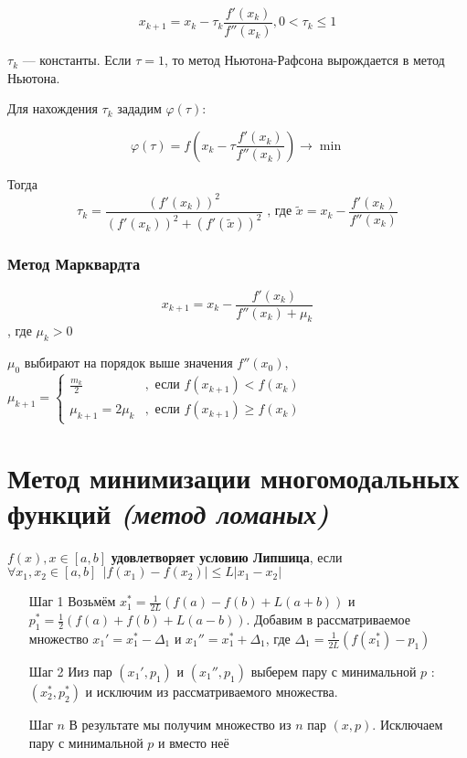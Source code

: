 \[x_{k+1} = x_k - \tau_k \frac{f'(x_k)}{f''(x_k)}, 0 < \tau_k \leq 1\]

\(\tau_k\) --- константы. Если \(\tau = 1\), то метод Ньютона-Рафсона вырождается в метод Ньютона.

Для нахождения \(\tau_k\) зададим \(\varphi(\tau)\):

\[\varphi(\tau) = f(x_k - \tau \frac{f'(x_k)}{f''(x_k)} ) \to \min\]

Тогда \[\tau_k = \frac{(f'(x_k))^2}{(f'(x_k))^2 + (f'(\tilde{x}))^2} \text{ , где } \tilde{x} = x_k - \frac{f'(x_k)}{f''(x_k)}  \]

\subsubsection{Метод Марквардта}

\[x_{k+1} = x_k - \frac{f'(x_k)}{f''(x_k) + \mu_k} \]
, где \(\mu_k > 0\)

\(\mu_0\) выбирают на порядок выше значения \(f''(x_0)\), \(\mu_{k + 1} = \begin{cases} \frac{m_k}{2} & , \text{ если } f(x_{k+1}) < f(x_k) \\ \mu_{k+1} = 2 \mu_k & , \text{ если } f(x_{k+1}) \geq f(x_k) \end{cases}\)

\section{Метод минимизации многомодальных функций \textit{(метод ломаных)}}

\begin{definition}
    \(f(x), x\in[a, b]\) \textbf{удовлетворяет условию Липшица}, если \(\forall x_1, x_2\in[a, b] \ \ |f(x_1) - f(x_2)| \leq L |x_1 - x_2|\)
\end{definition}

\begin{itemize}
    \item [Шаг 1] Возьмём \(x_1^* = \frac{1}{2L}(f(a) - f(b) + L(a + b))\) и \(p_1^* = \frac{1}{2}(f(a) + f(b) + L(a - b))\). Добавим в рассматриваемое множество \(x_1' = x_1^* - \Delta_1\) и \(x_1'' = x_1^* + \Delta_1\), где \(\Delta_1 = \frac{1}{2L} (f(x_1^*) - p_1)\)
    \item [Шаг 2] Ииз пар \((x_1', p_1)\) и \((x_1'', p_1)\) выберем пару с минимальной \(p\) : \((x_2^*, p_2^*)\) и исключим из рассматриваемого множества.
    \item [Шаг \(n\)] В результате мы получим множество из \(n\) пар \((x, p)\). Исключаем пару с минимальной \(p\) и вместо неё
\end{itemize}


